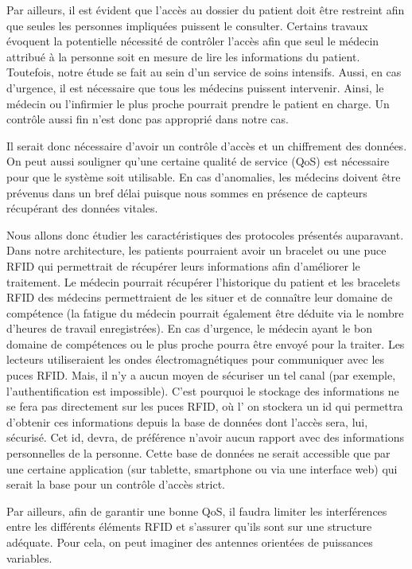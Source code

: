 \documentclass{article}
\begin{document}
Par ailleurs, il est évident que l’accès au dossier du patient doit être restreint afin que seules les personnes impliquées puissent le consulter. Certains travaux évoquent la potentielle nécessité de contrôler l’accès afin que seul le médecin attribué à la personne soit en mesure de lire les informations du patient. Toutefois, notre étude se fait au sein d’un service de soins intensifs. Aussi, en cas d’urgence, il est nécessaire que tous les médecins puissent intervenir. Ainsi, le médecin ou l'infirmier le plus proche pourrait prendre le patient en charge. Un contrôle aussi fin n’est donc pas approprié dans notre cas.

Il serait donc nécessaire d’avoir un contrôle d’accès et un chiffrement des données. On peut aussi souligner qu’une certaine qualité de service (QoS) est nécessaire pour que le système soit utilisable. En cas d’anomalies, les médecins doivent être prévenus dans un bref délai puisque nous sommes en présence de capteurs récupérant des données vitales. 

Nous allons donc étudier les caractéristiques des protocoles présentés auparavant.
\\

Dans notre architecture, les patients pourraient avoir un bracelet ou une puce RFID qui permettrait de récupérer leurs informations afin d’améliorer le traitement. Le médecin pourrait récupérer l’historique du patient et les bracelets RFID des médecins permettraient de les situer et de connaître leur domaine de compétence (la fatigue du médecin pourrait également être déduite via le nombre d’heures de travail enregistrées). En cas d’urgence, le médecin ayant le bon domaine de compétences ou le plus proche pourra être envoyé pour la traiter. Les lecteurs utiliseraient les ondes électromagnétiques pour communiquer avec les puces RFID. Mais, il n’y a aucun moyen de sécuriser un tel canal (par exemple, l’authentification est impossible). C'est pourquoi le stockage des informations ne se fera pas directement sur les puces RFID, où l' on stockera un id qui permettra d’obtenir ces informations depuis la base de données dont l'accès sera, lui, sécurisé. Cet id, devra, de préférence n’avoir aucun rapport avec des informations personnelles de la personne. Cette base de données ne serait accessible que par une certaine application (sur tablette, smartphone ou via une interface web) qui serait la base pour un contrôle d’accès strict.

Par ailleurs, afin de garantir une bonne QoS, il faudra limiter les interférences entre les différents éléments RFID et s’assurer qu’ils sont sur une structure adéquate. Pour cela, on peut imaginer des antennes orientées de puissances variables. 
\\
\end{document}
